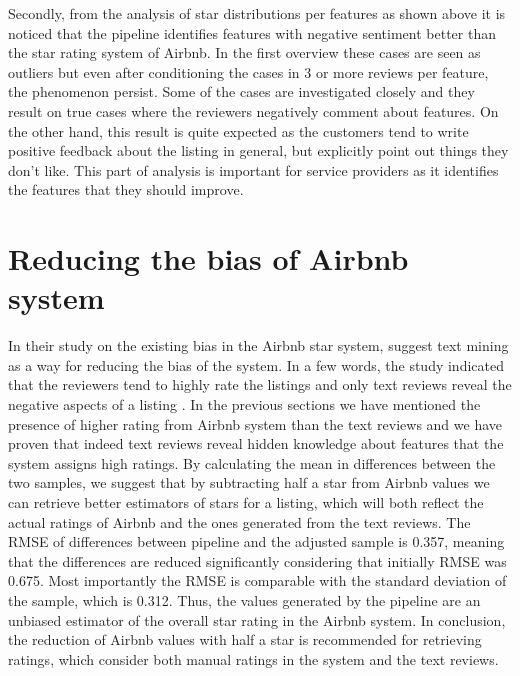 Secondly, from the analysis of star distributions per features as shown above it is noticed that the pipeline identifies features with negative sentiment better than the star rating system of Airbnb. In the first overview these cases are seen as outliers but even after conditioning the cases in 3 or more reviews per feature,
the phenomenon persist. Some of the cases are investigated closely and they result on true cases where the reviewers negatively comment about features. On the other hand, this result is quite expected as the customers tend to write positive feedback about the listing in general, but explicitly point out things they don't like. This part of analysis is important for service providers as it identifies the features that they should improve.

\section{Reducing the bias of Airbnb system}
In their study on the existing bias in the Airbnb star system, \cite{fradkin2016bias} suggest text mining as a way for reducing the bias of the system. In a few words, the study indicated that the reviewers tend to highly rate the listings and only text reviews reveal the negative aspects of a listing \cite{fradkin2016bias,pavlou2006institutional,pavlou2006nature}. In the previous sections we have mentioned the presence of higher rating from Airbnb system than the text reviews and  we have proven that indeed text reviews reveal hidden knowledge about features that the system assigns high ratings. By calculating the mean in differences between the two samples, we suggest that by subtracting half a star from Airbnb values we can retrieve better estimators of stars for a listing, which will both reflect the actual ratings of Airbnb and the ones generated from the text reviews. The RMSE of differences between pipeline and the adjusted sample is 0.357, meaning that the differences are reduced significantly considering that initially RMSE was 0.675. Most importantly the RMSE is comparable with the standard deviation of the sample, which is 0.312. Thus, the values generated by the pipeline are an unbiased estimator of the overall star rating in the Airbnb system. In conclusion, the reduction of Airbnb values with half a star is recommended for retrieving ratings, which consider both manual ratings in the system and the text reviews.

